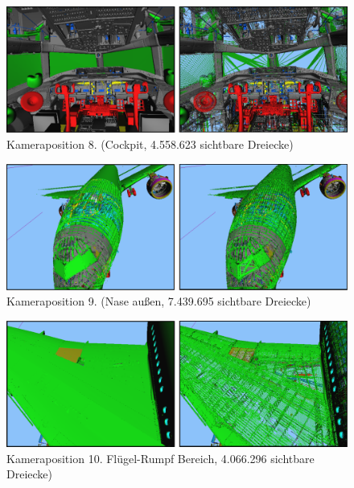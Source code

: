 \begin{figure}
\centering
\includegraphics[width=\hsize]{images/pos8.pdf}
\caption[Kameraposition 8]{\label{fig:eval:pos8}Kameraposition 8. (Cockpit, 4.558.623 sichtbare Dreiecke)}
\end{figure}

\begin{figure}
\centering
\includegraphics[width=\hsize]{images/pos9.pdf}
\caption[Kameraposition 9]{\label{fig:eval:pos9}Kameraposition 9. (Nase außen, 7.439.695 sichtbare Dreiecke)}
\end{figure}

\begin{figure}
\centering
\includegraphics[width=\hsize]{images/pos10.pdf}
\caption[Kameraposition 10]{\label{fig:eval:pos10}Kameraposition 10. Flügel-Rumpf Bereich, 4.066.296 sichtbare Dreiecke)}
\end{figure}

